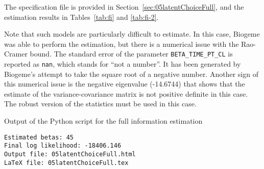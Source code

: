 \documentclass[12pt,a4paper]{article}
\begin{document}
The specification file is provided in
Section~\ref{sec:05latentChoiceFull}, and the estimation results in
Tables~\ref{tab:fi} and \ref{tab:fi-2}.

Note that such models are particularly difficult to estimate. In this
case, Biogeme was able to perform the estimation, but there is a
numerical issue with the Rao-Cramer bound. The standard error of the
parameter \lstinline+BETA_TIME_PT_CL+ is reported as \lstinline+nan+,
which stands for ``not a number''. It has been generated by Biogeme's attempt to take the
square root of a negative number. Another sign of this numerical issue
is the negative eigenvalue (-14.6744) that shows that the estimate of
the variance-covariance matrix is not positive definite in this
case. The robust version of the statistics must be used in this case. 

\begin{table}[htb]
\caption{\label{tab:fi_output}Output of the Python script for the full
information estimation}
  \begin{lstlisting}
Estimated betas: 45
Final log likelihood: -18406.146
Output file: 05latentChoiceFull.html
LaTeX file: 05latentChoiceFull.tex
  \end{lstlisting}
\end{table}
\end{document}
